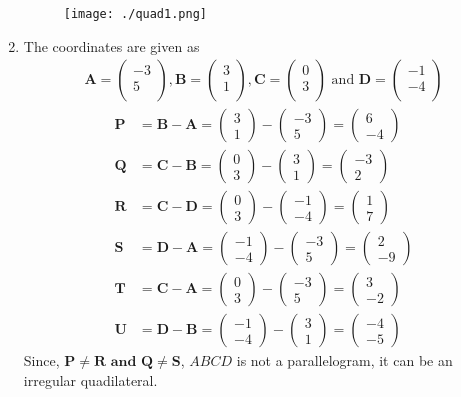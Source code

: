 \documentclass[12pt]{article}
\newcommand{\myvec}[1]{\ensuremath{\begin{pmatrix}#1\end{pmatrix}}}
\let\vec\mathbf
\begin{document}
\begin{enumerate}
\begin{figure}[!h]
	\begin{center} 
	    \texttt{[image: ./quad1.png]}
	\end{center}
\caption{}
\label{fig:Fig1}
\end{figure}

\item The coordinates are given as
	\begin{align}
	\vec{A} = \myvec{
		-3\\
		5\\
		},
	\vec{B} = \myvec{
		3\\
		1\\
		},
	\vec{C} = \myvec{
		0\\
		3\\
		} \text{ and }
	\vec{D} = \myvec{
		-1\\
		-4\\
		}
	\end{align}
	\begin{align}
		\vec{P} &= \vec{B} - \vec{A} = \myvec{3\\1} - \myvec{-3\\5} = \myvec{6\\-4}\\
		\vec{Q} &= \vec{C} - \vec{B} = \myvec{0\\3} - \myvec{3\\1} = \myvec{-3\\2}\\
		\vec{R} &= \vec{C} - \vec{D} = \myvec{0\\3} - \myvec{-1\\-4} = \myvec{1\\7}\\
		\vec{S} &= \vec{D} - \vec{A} = \myvec{-1\\-4} - \myvec{-3\\5} = \myvec{2\\-9}\\
		\vec{T} &= \vec{C} - \vec{A} = \myvec{0\\3} - \myvec{-3\\5} = \myvec{3\\-2}\\
		\vec{U} &= \vec{D} - \vec{B} = \myvec{-1\\-4} - \myvec{3\\1} = \myvec{-4\\-5}
	\end{align}
	Since, $\vec{P} \neq \vec{R \text{ and } \vec{Q} \neq \vec{S}}$, $ABCD$ is not a parallelogram, it can be an irregular quadilateral.\\ 

\end{enumerate}
\end{document}
